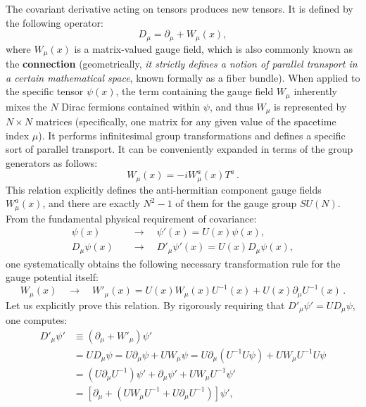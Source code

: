 The covariant derivative acting on tensors produces new tensors. It is defined by the following operator:
\begin{equation} \label{eq:cov_derivative_def}
    D_\mu = \partial_\mu + W_\mu(x),
\end{equation}
where \(W_\mu(x)\) is a matrix-valued gauge field, which is also commonly known as the \textbf{connection} (geometrically, \textit{it strictly defines a notion of parallel transport in a certain mathematical space}, known formally as a fiber bundle). When applied to the specific tensor \(\psi(x)\), the term containing the gauge field \(W_\mu\) inherently mixes the \(N\) Dirac fermions contained within \(\psi\), and thus \(W_\mu\) is represented by \(N \times N\) matrices (specifically, one matrix for any given value of the spacetime index \(\mu\)). It performs infinitesimal group transformations and defines a specific sort of parallel transport. It can be conveniently expanded in terms of the group generators as follows:
\begin{equation} \label{eq:gauge_field_expansion}
    W_\mu(x) = -iW_\mu^a(x)T^a \, .
\end{equation}
This relation explicitly defines the anti-hermitian component gauge fields \(W_\mu^a(x)\), and there are exactly \(N^2 - 1\) of them for the gauge group \(SU(N)\). From the fundamental physical requirement of covariance:
\[
    \begin{aligned}
        \psi(x) \quad      & \rightarrow \quad \psi'(x) = U(x)\psi(x),            \\
        D_\mu\psi(x) \quad & \rightarrow \quad D'_\mu\psi'(x) = U(x)D_\mu\psi(x),
    \end{aligned}
\]
one systematically obtains the following necessary transformation rule for the gauge potential itself:
\begin{equation} \label{eq:gauge_potential_transform}
    W_\mu(x) \quad \rightarrow \quad W'_\mu(x) = U(x)W_\mu(x)U^{-1}(x) + U(x)\partial_\mu U^{-1}(x) \, .
\end{equation}
Let us explicitly prove this relation. By rigorously requiring that \(D'_\mu\psi' = U D_\mu\psi\), one computes:
\begin{equation} \label{eq:proof_gauge_transform}
    \begin{aligned}
        D'_\mu\psi' & \equiv (\partial_\mu + W'_\mu)\psi'                                                               \\
                    & = U D_\mu\psi = U\partial_\mu\psi + U W_\mu\psi = U\partial_\mu(U^{-1}U\psi) + UW_\mu U^{-1}U\psi \\
                    & = (U\partial_\mu U^{-1})\psi' + \partial_\mu\psi' + UW_\mu U^{-1}\psi'                            \\
                    & = [\partial_\mu + (UW_\mu U^{-1} + U\partial_\mu U^{-1})]\psi',
    \end{aligned}
\end{equation}
